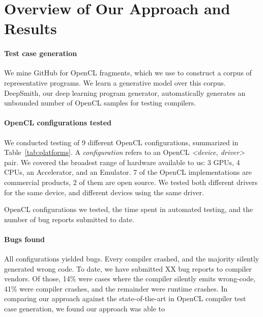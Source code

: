 \section{Overview of Our Approach and Results}\label{sec:overview}

\paragraph{Test case generation} We mine GitHub for OpenCL fragments, which we use to construct a corpus of representative programs. We learn a generative model over this corpus. DeepSmith, our deep learning program generator, automatically generates an unbounded number of OpenCL samples for testing compilers.

\paragraph{OpenCL configurations tested} We conducted testing of 9 different OpenCL configurations, summarized in Table~\ref{tab:platforms}. A \emph{configuration} refers to an OpenCL \emph{<device, driver>} pair. We covered the broadest range of hardware available to us: 3 GPUs, 4 CPUs, an Accelerator, and an Emulator. 7 of the OpenCL implementations are commercial products, 2 of them are open source. We tested both different drivers for the same device, and different devices using the same driver.


\begin{table*}[t!]
	\scriptsize %
	\centering %
	
	\caption{OpenCL configurations we tested, the time spent in automated testing, and the number of bug reports submitted to date.}
	\label{tab:platforms}
\end{table*}


\paragraph{Bugs found} All configurations yielded bugs. Every compiler crashed, and the majority silently generated wrong code. To date, we have submitted XX bug reports to compiler vendors. Of those, 14\% were cases where the compiler silently emits wrong-code, 41\% were compiler crashes, and the remainder were runtime crashes. In comparing our approach against the state-of-the-art in OpenCL compiler test case generation, we found our approach was able to \cc{\ldots}